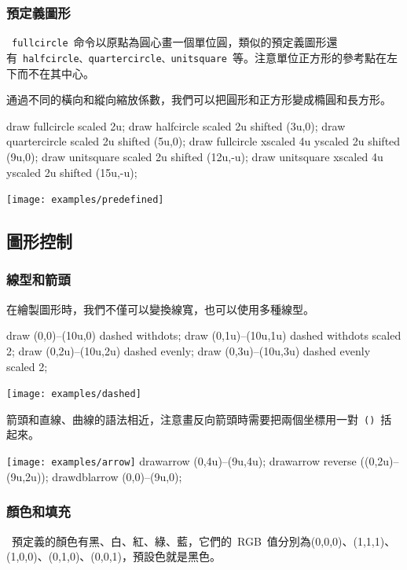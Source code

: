 \subsubsection{預定義圖形}
~\verb|fullcircle|~命令以原點為圓心畫一個單位圓，類似的預定義圖形還有~\verb|halfcircle、quartercircle、unitsquare|~等。注意單位正方形的參考點在左下而不在其中心。

通過不同的橫向和縱向縮放係數，我們可以把圓形和正方形變成橢圓和長方形。

\begin{code}
draw fullcircle scaled 2u;
draw halfcircle scaled 2u shifted (3u,0);
draw quartercircle scaled 2u shifted (5u,0);
draw fullcircle xscaled 4u yscaled 2u shifted (9u,0);
draw unitsquare scaled 2u shifted (12u,-u);
draw unitsquare xscaled 4u yscaled 2u shifted (15u,-u);
\end{code}

\begin{out}
\texttt{[image: examples/predefined]}
\end{out}

\subsection{圖形控制}

\subsubsection{線型和箭頭}
在繪製圖形時，我們不僅可以變換線寬，也可以使用多種線型。
\begin{code}
draw (0,0)--(10u,0) dashed withdots;
draw (0,1u)--(10u,1u) dashed withdots scaled 2;
draw (0,2u)--(10u,2u) dashed evenly;
draw (0,3u)--(10u,3u) dashed evenly scaled 2;
\end{code}

\begin{out}
\texttt{[image: examples/dashed]}
\end{out}

箭頭和直線、曲線的語法相近，注意畫反向箭頭時需要把兩個坐標用一對~\verb|()|~括起來。

\begin{fdemo}{\texttt{[image: examples/arrow]}}
drawarrow (0,4u)--(9u,4u);
drawarrow reverse ((0,2u)--(9u,2u));
drawdblarrow (0,0)--(9u,0);
\end{fdemo}

\subsubsection{顏色和填充}
\MP~預定義的顏色有黑、白、紅、綠、藍，它們的~RGB~值分別為(0,0,0)、(1,1,1)、(1,0,0)、(0,1,0)、(0,0,1)，預設色就是黑色。

